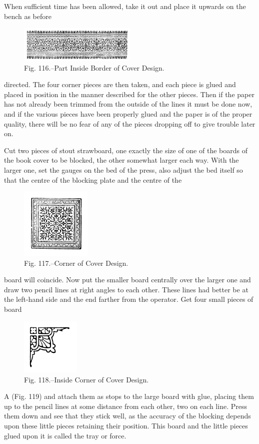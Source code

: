 \documentclass[twoside]{book}
\begin{document}
When sufficient time has been allowed, take it
out and place it upwards on the bench as before
	\begin{figure}[h]
		\centering
		\includegraphics[width=0.5\textwidth]{Figures/_116.png}
		\caption*{Fig. 116.--Part Inside Border of Cover Design.}
	\end{figure}
directed. The four corner pieces are then taken,
and each piece is glued and placed in position in the
manner described for the other pieces. Then if the
paper has not already been trimmed from the outside
of the lines it must be done now, and if the
various pieces have been properly glued and the
paper is of the proper quality, there will be no fear
\pagebreak
of any of the pieces dropping off to give trouble
later on.

Cut two pieces of stout strawboard, one exactly
the size of one of the boards of the book cover to
be blocked, the other somewhat larger each way.
With the larger one, set the gauges on the bed of
the press, also adjust the bed itself so that the
centre of the blocking plate and the centre of the
	\begin{figure}[h]
		\centering
		\includegraphics[width=0.3\textwidth]{Figures/_117.png}
		\caption*{Fig. 117.--Corner of Cover Design.}
	\end{figure}
board will coincide. Now put the smaller board
centrally over the larger one and draw two pencil
lines at right angles to each other. These lines had
better be at the left-hand side and the end farther
from the operator. Get four small pieces of board
	\begin{figure}[h]
		\centering
		\includegraphics[width=0.25\textwidth]{Figures/_118.png}
		\caption*{Fig. 118.--Inside Corner of Cover Design.}
	\end{figure}
A (Fig. 119) and attach them as stops to the large
board with glue, placing them up to the pencil lines
at some distance from each other, two on each line.
Press them down and see that they stick well, as
the accuracy of the blocking depends upon these
little pieces retaining their position. This board
and the little pieces glued upon it is called the
tray or force.
\end{document}
